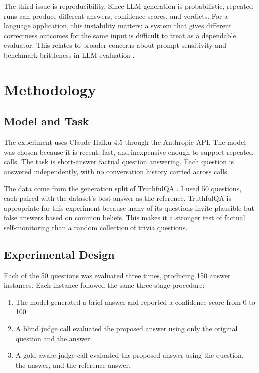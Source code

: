\documentclass[11pt,a4paper]{article}
\begin{document}
The third issue is reproducibility. Since LLM generation is probabilistic, repeated runs can produce different answers, confidence scores, and verdicts. For a language application, this instability matters: a system that gives different correctness outcomes for the same input is difficult to treat as a dependable evaluator. This relates to broader concerns about prompt sensitivity and benchmark brittleness in LLM evaluation \cite{sclar2024quantifying}.

\section{Methodology}

\subsection{Model and Task}

The experiment uses Claude Haiku 4.5 through the Anthropic API. The model was chosen because it is recent, fast, and inexpensive enough to support repeated calls. The task is short-answer factual question answering. Each question is answered independently, with no conversation history carried across calls.

The data come from the generation split of TruthfulQA \cite{lin2022truthfulqa}. I used 50 questions, each paired with the dataset's best answer as the reference. TruthfulQA is appropriate for this experiment because many of its questions invite plausible but false answers based on common beliefs. This makes it a stronger test of factual self-monitoring than a random collection of trivia questions.

\subsection{Experimental Design}

Each of the 50 questions was evaluated three times, producing 150 answer instances. Each instance followed the same three-stage procedure:

\begin{enumerate}
    \item The model generated a brief answer and reported a confidence score from 0 to 100.
    \item A blind judge call evaluated the proposed answer using only the original question and the answer.
    \item A gold-aware judge call evaluated the proposed answer using the question, the answer, and the reference answer.
\end{enumerate}
\end{document}
